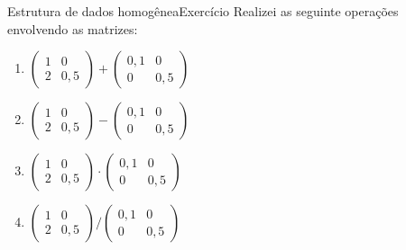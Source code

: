 \documentclass[
  10pt,
  ignorenonframetext,
]{beamer}
\providecommand{\tightlist}{%
  \setlength{\itemsep}{0pt}\setlength{\parskip}{0pt}}
\begin{document}
\begin{frame}{Estrutura de dados homogênea\newline Exercício}
\protect\hypertarget{estrutura-de-dados-homoguxeaneaexercuxedcio-1}{}
Realizei as seguinte operações envolvendo as matrizes:

\begin{enumerate}
\tightlist
\item
  \(\begin{pmatrix} 1 & 0\\ 2 & 0,5 \end{pmatrix} + \begin{pmatrix} 0,1 & 0\\ 0 & 0,5 \end{pmatrix}\)
\item
  \(\begin{pmatrix} 1 & 0\\ 2 & 0,5 \end{pmatrix} - \begin{pmatrix} 0,1 & 0\\ 0 & 0,5 \end{pmatrix}\)
\item
  \(\begin{pmatrix} 1 & 0\\ 2 & 0,5 \end{pmatrix} \cdot \begin{pmatrix} 0,1 & 0\\ 0 & 0,5 \end{pmatrix}\)
\item
  \(\begin{pmatrix} 1 & 0\\ 2 & 0,5 \end{pmatrix} / \begin{pmatrix} 0,1 & 0\\ 0 & 0,5 \end{pmatrix}\)
\end{enumerate}
\end{frame}
\end{document}
